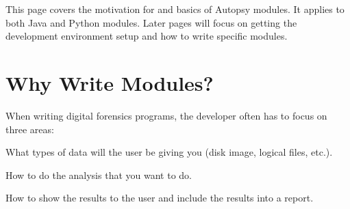This page covers the motivation for and basics of Autopsy modules. It applies to both Java and Python modules. Later pages will focus on getting the development environment setup and how to write specific modules.\hypertarget{platform_page_platform_motivation}{}\section{Why Write Modules?}\label{platform_page_platform_motivation}
When writing digital forensics programs, the developer often has to focus on three areas\+:
\begin{DoxyItemize}
\item What types of data will the user be giving you (disk image, logical files, etc.).
\item How to do the analysis that you want to do.
\item How to show the results to the user and include the results into a report.
\end{DoxyItemize}

